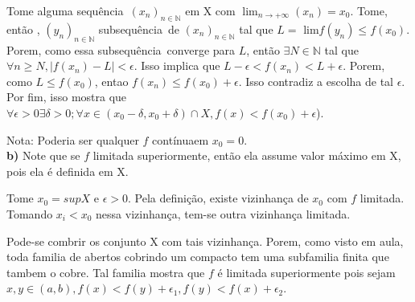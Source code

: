 \documentclass[12pt,twoside]{article}
\newcommand{\defi}{definição}
\newcommand{\ent}{então }
\newcommand{\eh}{é }
\newcommand{\seq}{sequência}
\newcommand{\cont}{contínua}
\newcommand{\limi}[2]{$\displaystyle{\lim_{n \to +\infty}}(#1)=#2$}
\newcommand{\N}{\mathbb{N}}
\begin{document}
	Tome alguma \seq\ $(x_n)_{n\in\N}$ em X com \limi{x_n}{x_0}. Tome, \ent, $(y_n)_{n\in\N}$ sub\seq\ de $(x_n)_{n\in\N}$ tal que $L =$ lim$f(y_n) \leq f(x_0)$. Porem, como essa sub\seq\ converge para $L$, \ent $\exists N \in \N$ tal que $\forall n \ge N, |f(x_n) - L| < \epsilon$. Isso implica que $L - \epsilon < f(x_n) < L + \epsilon$. Porem, como $L \leq f(x_0)$, entao $f(x_n) \leq f(x_0) + \epsilon$. Isso contradiz a escolha de tal $\epsilon$. Por fim, isso mostra que $\forall \epsilon > 0 \exists \delta > 0; \forall x \in (x_0 - \delta, x_0 + \delta)\cap X, f(x) < f(x_0) + \epsilon$).\\
	
	

	Nota: Poderia ser qualquer $f$ \cont em $x_0 = 0$.\\


	\textbf{b)} Note que se $f$ limitada superiormente, \ent ela assume valor máximo em X, pois ela \eh definida em X.
	
	Tome $x_0 = supX$ e $\epsilon>0$. Pela \defi, existe vizinhança de $x_0$ com $f$ limitada. Tomando $x_i < x_0$ nessa vizinhança, tem-se outra vizinhança limitada.
	
	Pode-se combrir os conjunto X com tais vizinhança. Porem, como visto em aula, toda familia de abertos cobrindo um compacto tem uma subfamilia finita que tambem o cobre. Tal familia mostra que $f$ \eh limitada superiormente pois sejam $x,y \in (a,b), f(x) < f(y) + \epsilon_1, f(y) < f(x) + \epsilon_2$.
\end{document}
